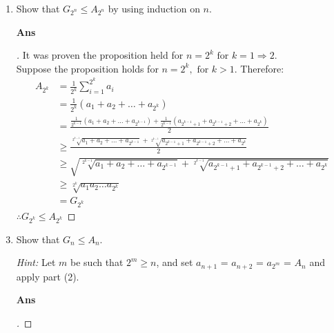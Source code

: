 \documentclass[paper=usletter, fontsize=12pt]{article}
\begin{document}
\begin{itemize}
\begin{itemize}
\begin{enumerate}
                \item Show that $G_{2^n} \le A_{2^n}$ by using induction on
                $n$.
                \item[\textbf{Ans}]
                \begin{proof}[\unskip\nopunct]
                    It was proven the proposition held for $n = 2^k \text{ for
                    \ } k = 1 \Rightarrow 2$. \\
                    Suppose the proposition holds for $n = 2^k, \text{ for \ }
                    k > 1$. Therefore:
                    \begin{align*}
                        A_{2^k} & = \frac{1}{2^k}\sum_{i=1}^{2^k}a_i \\
                        & = \frac{1}{2^k}(a_1 + a_2 + \ldots + a_{2^k}) \\
                        & = \frac{\frac{1}{2^{k-1}}(a_1 + a_2 + \ldots +
                        a_{2^{k-1}}) + \frac{1}{2^{k-1}}(a_{2^{k-1}+1} +
                        a_{2^{k-1}+2} + \ldots + a_{2^k})}{2} \\
                        & \ge \frac{\sqrt[2^{k-1}]{a_1 + a_2 + \ldots +
                        a_{2^{k-1}}} + \sqrt[2^{k-1}]{a_{2^{k-1}+1} +
                        a_{2^{k-1}+2} + \ldots + a_{2^k}}}{2} \\
                        & \ge \sqrt{\sqrt[2^{k-1}]{a_1 + a_2 + \ldots +
                        a_{2^{k-1}}} + \sqrt[2^{k-1}]{a_{2^{k-1}+1} +
                        a_{2^{k-1}+2} + \ldots + a_{2^k}}} \\
                        & \ge \sqrt[2^k]{a_{1}a_{2}\ldots a_{2^k}} \\
                        & = G_{2^k}
                    \end{align*}
                    $\therefore G_{2^k} \le A_{2^k}$ \qedhere
                \end{proof}
                \vspace{0.2in}

                \item Show that $G_n \le A_n$.

                \textit{Hint:} Let $m$ be such that $2^m \ge n$, and set
                $a_{n+1}$ = $a_{n+2}$ = $a_{2^m}$ = $A_n$ and apply part (2).

                \item[\textbf{Ans}]
                \begin{proof}[\unskip\nopunct]
                \end{proof}
                \vspace{0.2in}


\end{enumerate}
\end{itemize}
\end{itemize}
\end{document}
